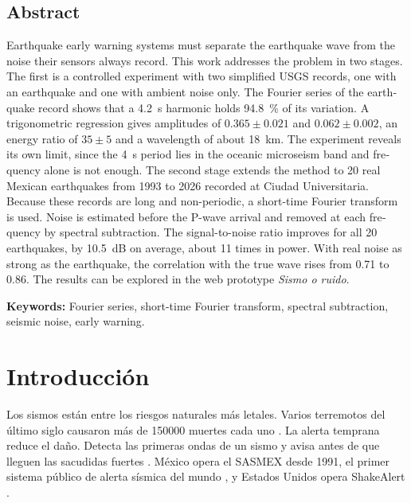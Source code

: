 \documentclass[11pt,letterpaper]{article}
\begin{document}
\begin{otherlanguage}{english}
\section*{Abstract}
Earthquake early warning systems must separate the earthquake wave from the noise their sensors always record. This work addresses the problem in two stages. The first is a controlled experiment with two simplified USGS records, one with an earthquake and one with ambient noise only. The Fourier series of the earthquake record shows that a \SI{4.2}{s} harmonic holds \SI{94.8}{\percent} of its variation. A trigonometric regression gives amplitudes of $0.365 \pm 0.021$ and $0.062 \pm 0.002$, an energy ratio of $35 \pm 5$ and a wavelength of about \SI{18}{km}. The experiment reveals its own limit, since the \SI{4}{s} period lies in the oceanic microseism band and frequency alone is not enough. The second stage extends the method to 20 real Mexican earthquakes from 1993 to 2026 recorded at Ciudad Universitaria. Because these records are long and non-periodic, a short-time Fourier transform is used. Noise is estimated before the P-wave arrival and removed at each frequency by spectral subtraction. The signal-to-noise ratio improves for all 20 earthquakes, by \SI{10.5}{dB} on average, about 11 times in power. With real noise as strong as the earthquake, the correlation with the true wave rises from 0.71 to 0.86. The results can be explored in the web prototype \textit{Sismo o ruido}.

\textbf{Keywords:} Fourier series, short-time Fourier transform, spectral subtraction, seismic noise, early warning.
\end{otherlanguage}

\clearpage
\tableofcontents
\clearpage

\section{Introducción}
Los sismos están entre los riesgos naturales más letales. Varios terremotos del último siglo causaron más de \num{150000} muertes cada uno \parencite{statista2025}. La alerta temprana reduce el daño. Detecta las primeras ondas de un sismo y avisa antes de que lleguen las sacudidas fuertes \parencite{allen2019}. México opera el SASMEX desde 1991, el primer sistema público de alerta sísmica del mundo \parencite{espinosa1995}, y Estados Unidos opera ShakeAlert \parencite{usgs_ehp}.
\end{document}
